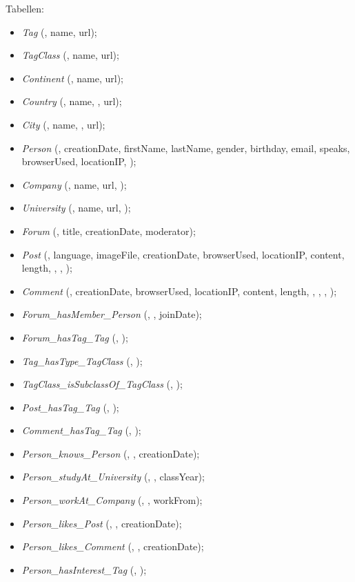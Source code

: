 Tabellen:
\begin{itemize}
  \item \emph{Tag} (, name, url);
  \item \emph{TagClass} (, name, url);
  \item \emph{Continent} (, name, url);
  \item \emph{Country} (, name, , url);
  \item \emph{City} (, name, , url);
  \item \emph{Person} (, creationDate, firstName, lastName, gender, birthday, email, speaks, browserUsed, locationIP, );
  \item \emph{Company} (, name, url, );
  \item \emph{University} (, name, url, );
  \item \emph{Forum} (, title, creationDate, moderator);
  \item \emph{Post} (, language, imageFile, creationDate, browserUsed, locationIP, content, length, , , );
  \item \emph{Comment} (, creationDate, browserUsed, locationIP, content, length, , , , );
  \item \emph{Forum\_hasMember\_Person} (, , joinDate);
  \item \emph{Forum\_hasTag\_Tag} (, );
  \item \emph{Tag\_hasType\_TagClass} (, );
  \item \emph{TagClass\_isSubclassOf\_TagClass} (, );
  \item \emph{Post\_hasTag\_Tag} (, );
  \item \emph{Comment\_hasTag\_Tag} (, );
  \item \emph{Person\_knows\_Person} (, , creationDate);
  \item \emph{Person\_studyAt\_University} (, , classYear);
  \item \emph{Person\_workAt\_Company} (, , workFrom);
  \item \emph{Person\_likes\_Post} (, , creationDate);
  \item \emph{Person\_likes\_Comment} (, , creationDate);
  \item \emph{Person\_hasInterest\_Tag} (, );
\end{itemize}


